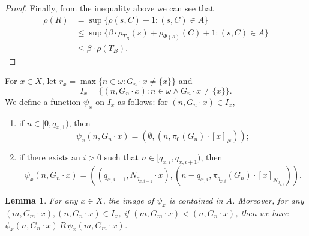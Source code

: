\documentclass[11pt]{amsart}
\newtheorem{lemma}[theorem]{Lemma}
\theoremstyle{definition}
\theoremstyle{remark}
\numberwithin{equation}{section}
\begin{document}
\begin{proof}
    Finally, from the inequality above we can see that
    \begin{align*}
        \rho(R)&=\sup\{\rho(s,C)+1:(s,C)\in A\}\\
        &\leq\sup\{\beta\cdot\rho_{T_B}(s)+\rho_{\Phi(s)}(C)+1:(s,C)\in A\}\\
        &\leq\beta\cdot\rho(T_B).
    \end{align*}

\end{proof}
For $x\in X$, let $r_x=\max\{n\in\omega:G_n\cdot x\ne\{x\}\}$ and
$$I_x=\{(n,G_n\cdot x):n\in\omega\land G_n\cdot x\ne\{x\}\}.$$
We define a function $\psi_x$ on $I_x$ as follows: for $(n,G_n\cdot x)\in I_x$,
\begin{enumerate}
    \item[(i)] if $n\in[0,q_{x,1})$, then
    $$\psi_x(n,G_n\cdot x)=(\emptyset,(n,\pi_0(G_n)\cdot[x]_N));$$
    \item[(ii)] if there exists an $i>0$ such that $n\in[q_{x,i},q_{x,i+1})$, then
    $$\psi_x(n,G_n\cdot x)=((q_{x,i-1},N_{q_{x,i-1}}\cdot x),(n-q_{x,i},\pi_{q_{x,i}}(G_n)\cdot[x]_{N_{q_{x,i}}})).$$
\end{enumerate}

\begin{lemma}\label{psix is order preserving}
    For any $x\in X$, the image of $\psi_x$ is contained in $A$. Moreover, for any $(m,G_m\cdot x),(n,G_n\cdot x)\in I_x$, if $(m,G_m\cdot x)<(n,G_n\cdot x)$, then we have $\psi_x(n,G_n\cdot x)\,R\,\psi_x(m,G_m\cdot x)$.
\end{lemma}
\end{document}

